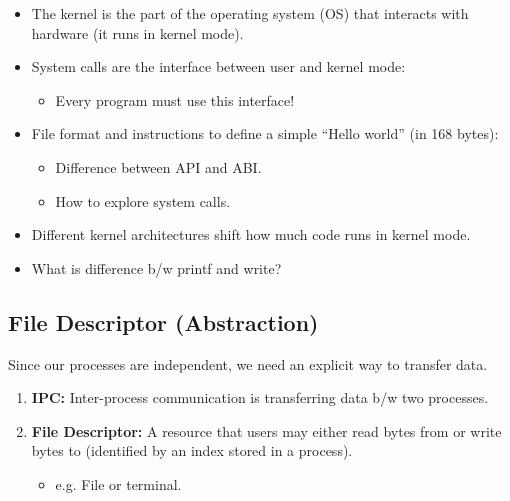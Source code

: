 \begin{summary}
    \begin{itemize}
        \item The kernel is the part of the operating system (OS) that interacts with hardware (it runs in kernel mode).
        \item System calls are the interface between user and kernel mode:
        \begin{itemize}
            \item Every program must use this interface!
        \end{itemize}
        \item File format and instructions to define a simple “Hello world” (in 168 bytes):
        \begin{itemize}
            \item Difference between API and ABI.
            \item How to explore system calls.
        \end{itemize}
        \item Different kernel architectures shift how much code runs in kernel mode.
    \end{itemize}    
\end{summary}

\begin{faq}
    \begin{itemize}
        \item What is difference b/w printf and write?
    \end{itemize}
\end{faq}
\subsection{File Descriptor (Abstraction)}
\begin{motivation}
    Since our processes are independent, we need an explicit way to transfer data.
\end{motivation}

\begin{definition}
    \begin{enumerate}
        \item \textbf{IPC:} Inter-process communication is transferring data b/w two processes.
        \item \textbf{File Descriptor:} A resource that users may either read bytes from or write bytes to (identified by an index stored in a process).
        \begin{itemize}
            \item e.g. File or terminal.
        \end{itemize}
    \end{enumerate}
\end{definition}

